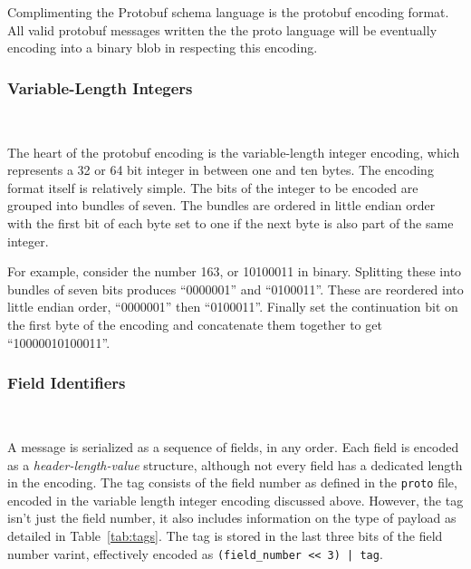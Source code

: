 Complimenting the Protobuf schema language is the protobuf encoding format. All
valid protobuf messages written the the proto language will be eventually
encoding into a binary blob in respecting this encoding.

\subsubsection{Variable-Length Integers}~\label{sec:proto-vint}

The heart of the protobuf encoding is the variable-length integer encoding,
which represents a 32 or 64 bit integer in between one and ten bytes. The
encoding format itself is relatively simple. The bits of the integer to be
encoded are grouped into bundles of seven. The bundles are ordered in little
endian order with the first bit of each byte set to one if the next byte is also
part of the same integer.

For example, consider the number 163, or 10100011 in binary. Splitting these
into bundles of seven bits produces ``0000001'' and ``0100011''. These are
reordered into little endian order, ``0000001'' then ``0100011''. Finally set
the continuation bit on the first byte of the encoding and concatenate them
together to get ``10000010100011''.

\subsubsection{Field Identifiers}~\label{sec:proto-header}

A message is serialized as a sequence of fields, in any order. Each field is
encoded as a \emph{header-length-value} structure, although not every field has a
dedicated length in the encoding. The tag consists of the field number as
defined in the \texttt{proto} file, encoded in the variable length integer
encoding discussed above. However, the tag isn't just the field number, it also
includes information on the type of payload as detailed in
Table~\ref{tab:tags}. The tag is stored in the last three bits of the
field number varint, effectively encoded as \texttt{(field\_number << 3) | tag}.

